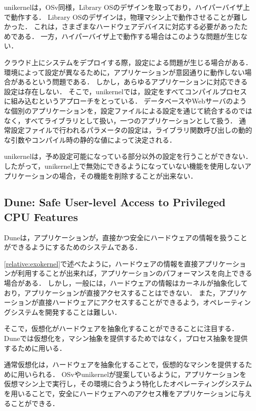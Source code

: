 \documentclass[graduation-thesis]{mlarticle}
\begin{document}
unikernelは，OSv同様，Library OSのデザインを取っており，ハイパーバイザ上で動作する．
Library OSのデザインは，物理マシン上で動作させることが難しかった．
これは，さまざまなハードウェアデバイスに対応する必要があったためである．
一方，ハイパーバイザ上で動作する場合はこのような問題が生じない．

クラウド上にシステムをデプロイする際，設定による問題が生じる場合がある．
環境によって設定が異なるために，アプリケーションが意図通りに動作しない場合があるという問題である．
しかし，あらゆるアプリケーションに対応できる設定は存在しない．
そこで，unikernelでは，設定をすべてコンパイルプロセスに組み込むというアプローチをとっている．
データベースやWebサーバのような個別のアプリケーションを，設定ファイルによる設定を通じて統合するのではなく，すべてライブラリとして扱い，一つのアプリケーションとして扱う．
通常設定ファイルで行われるパラメータの設定は，ライブラリ関数呼び出しの動的な引数やコンパイル時の静的な値によって決定される．

unikernelは，予め設定可能になっている部分以外の設定を行うことができない．
したがって，unikernel上で無効にできるようになっていない機能を使用しないアプリケーションの場合，その機能を削除することが出来ない．

\subsection{Dune: Safe User-level Access to Privileged CPU Features}
\label{relative:dune}
Duneは，アプリケーションが，直接かつ安全にハードウェアの情報を扱うことができるようにするためのシステムである．

\ref{relative:exokernel}で述べたように，ハードウェアの情報を直接アプリケーションが利用することが出来れば，アプリケーションのパフォーマンスを向上できる場合がある．
しかし，一般には，ハードウェアの情報はカーネルが抽象化しており，アプリケーションが直接アクセスすることはできない．
また，アプリケーションが直接ハードウェアにアクセスすることができるよう，オペレーティングシステムを開発することは難しい．

そこで，仮想化がハードウェアを抽象化することができることに注目する．
Duneでは仮想化を，マシン抽象を提供するためではなく，プロセス抽象を提供するために用いる．

通常仮想化は，ハードウェアを抽象化することで，仮想的なマシンを提供するために用いられる．
OSvやunikernelが提案しているように，アプリケーションを仮想マシン上で実行し，その環境に合うよう特化したオペレーティングシステムを用いることで，安全にハードウェアへのアクセス権をアプリケーションに与えることができる．
\end{document}

